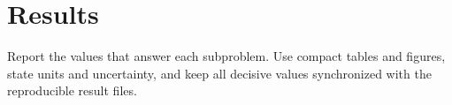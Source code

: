 \section{Results}

Report the values that answer each subproblem. Use compact tables and figures,
state units and uncertainty, and keep all decisive values synchronized with the
reproducible result files.

